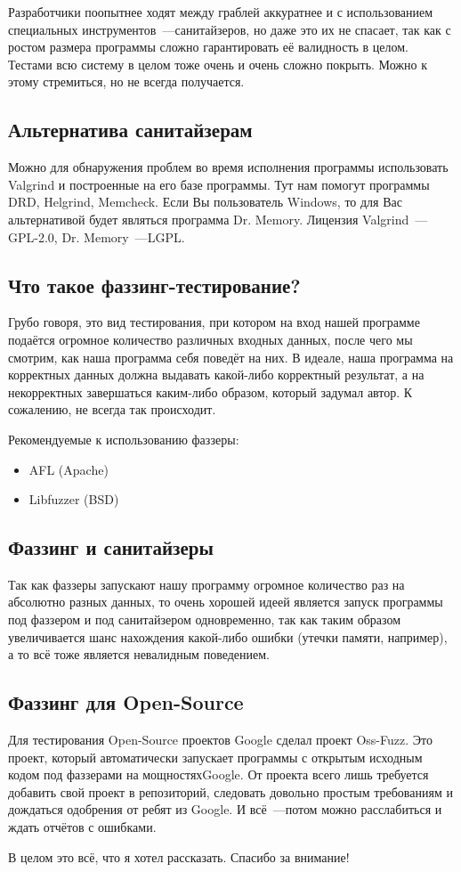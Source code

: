 \documentclass[10pt, a5paper]{article}
\begin{document}
Разработчики поопытнее ходят между граблей аккуратнее и с использованием специальных инструментов~---санитайзеров, но даже это их не спасает, так как с ростом размера программы сложно гарантировать её валидность в целом. Тестами всю систему в целом тоже очень и очень сложно покрыть. Можно к этому стремиться, но не всегда получается.

\subsection*{Альтернатива санитайзерам}

Можно для обнаружения проблем во время исполнения программы использовать Valgrind и построенные на его базе программы. Тут нам помогут программы DRD, Helgrind, Memcheck. Если Вы пользователь Windows, то для Вас альтернативой будет являться программа Dr. Memory. Лицензия Valgrind~---GPL-2.0, Dr. Memory~---LGPL.

\subsection*{Что такое фаззинг-тестирование?}

Грубо говоря, это вид тестирования, при котором на вход нашей программе подаётся огромное количество различных входных данных, после чего мы смотрим, как наша программа себя поведёт на них. В идеале, наша программа на корректных данных должна выдавать какой-либо корректный результат, а на некорректных завершаться каким-либо образом, который задумал автор. К сожалению, не всегда так происходит.

Рекомендуемые к использованию фаззеры: 
\begin{itemize}
\item AFL (Apache)
\item Libfuzzer (BSD)
\end{itemize}

\subsection*{Фаззинг и санитайзеры}

Так как фаззеры запускают нашу программу огромное количество раз на абсолютно разных данных, то очень хорошей идеей является запуск программы под фаззером и под санитайзером одновременно, так как таким образом увеличивается шанс нахождения какой-либо ошибки (утечки памяти, например), а то всё тоже является невалидным поведением.

\subsection*{Фаззинг для Open-Source}

Для тестирования Open-Source проектов Google сделал проект Oss-Fuzz. Это проект, который автоматически запускает программы с открытым исходным кодом под фаззерами на мощностях\linebreak Google. От проекта всего лишь требуется добавить свой проект в репозиторий, следовать довольно простым требованиям и дождаться одобрения от ребят из Google. И всё~---потом можно расслабиться и ждать отчётов с ошибками.

В целом это всё, что я хотел рассказать. Спасибо за внимание!
\end{document}
